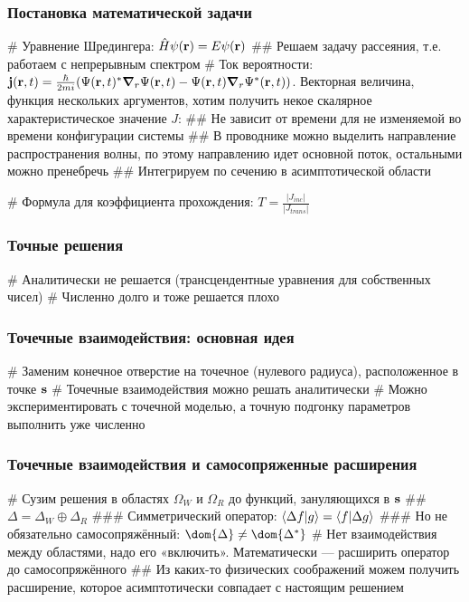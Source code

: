 \documentclass{beamer}
\begin{document}
\begin{frame}[fragile]
\frametitle{Постановка математической задачи}
\begin{easylist}[itemize]
# Уравнение Шредингера: $\hat{H} \psi(\vb{r}) = E \psi(\vb{r})$
## Решаем задачу рассеяния, т.е. работаем с непрерывным спектром
# Ток вероятности: $\vb{j}(\vb{r}, t) = \frac{\hbar}{2 m i} (\Psi(\vb{r}, t)^* \grad_r{\Psi(\vb{r}, t)} - \Psi(\vb{r}, t) \grad_r{\Psi^*(\vb{r}, t))}$. Векторная величина, функция нескольких аргументов, хотим получить некое скалярное характеристическое значение $J$:
## Не зависит от времени для не изменяемой во времени конфигурации системы
## В проводнике можно выделить направление распространения волны, по этому направлению идет основной поток, остальными можно пренебречь
## Интегрируем по сечению в асимптотической области

# Формула для коэффициента прохождения: $T = \frac{|J_{inc}|}{|J_{trans}|}$
\end{easylist}
\end{frame}


\begin{frame}[fragile]
\frametitle{Точные решения}
\begin{easylist}[itemize]
# Аналитически не решается (трансцендентные уравнения для собственных чисел)
# Численно долго и тоже решается плохо
\end{easylist}
\end{frame}

\begin{frame}[fragile]
\frametitle{Точечные взаимодействия: основная идея}
\begin{easylist}[itemize]
# Заменим конечное отверстие на точечное (нулевого радиуса), расположенное в точке $\vb{s}$
# Точечные взаимодействия можно решать аналитически
# Можно экспериментировать с точечной моделью, а точную подгонку параметров выполнить уже численно
\end{easylist}
\end{frame}

\begin{frame}[fragile]
\frametitle{Точечные взаимодействия и самосопряженные расширения}
\begin{easylist}[itemize]
# Сузим решения в областях $\Omega_W$ и $\Omega_R$ до функций, зануляющихся в $\vb{s}$
## $\Delta = \Delta_W \oplus \Delta_R$
### Симметрический оператор: $\ip{\Delta f}{g} = \ip{f}{\Delta g}$
### Но не обязательно самосопряжённый: $\dom{\Delta} \ne \dom{\Delta^*}$
# Нет взаимодействия между областями, надо его «включить». Математически — расширить оператор до самосопряжённого
## Из каких-то физических соображений можем получить расширение, которое асимптотически совпадает с настоящим решением
\end{easylist}
\end{frame}
\end{document}
